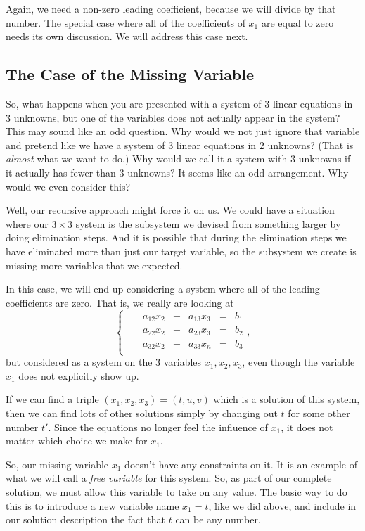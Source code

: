 \documentclass[00-livre-main.tex]{subfiles}
\begin{document}
Again, we need a non-zero leading coefficient, because we will divide by that number.
The special case where all of the coefficients of $x_1$ are equal to zero needs its own discussion. We will address this case next. 

\subsection*{The Case of the Missing Variable}

So, what happens when you are presented with a system of $3$ linear equations in $3$ unknowns, but one of the variables does not actually appear in the system? This may sound like an odd question. Why would we not just ignore that variable and pretend like we have a system of $3$ linear equations in $2$ unknowns? (That is \emph{almost} what we want to do.) Why would we call it a system with $3$ unknowns if it actually has fewer than $3$ unknowns? It seems like an odd arrangement. Why would we even consider this?

Well, our recursive approach might force it on us. We could have a situation where our $3\times 3$ system is the subsystem we devised from something larger by doing elimination steps. And it is possible that during the elimination steps we have eliminated more than just our target variable, so the subsystem we create is missing more variables that we expected.

In this case, we will end up considering a system where all of the leading coefficients are zero. That is, we really are looking at
\[
\left\{\begin{array}{rrrrrrrrr}
 &  & a_{12} x_2 & + & a_{13}x_3 & = & b_1 \\
 &  & a_{22} x_2 & + & a_{23}x_3 & = & b_2 \\
 &  & a_{32} x_2 & + & a_{33}x_n & = & b_3 \\
\end{array}\right. ,
\]
but considered as a system on the $3$ variables $x_1, x_2, x_3$, even though the variable $x_1$ does not explicitly show up. 

If we can find a triple $(x_1,x_2,x_3) = (t,u,v)$ which is a solution of this system, then we can find lots of other solutions simply by changing out $t$ for some other number $t'$. Since the equations no longer feel the influence of $x_1$, it does not matter which choice we make for $x_1$. 

So, our missing variable $x_1$ doesn't have any constraints on it. It is an example of what we will call a \emph{free variable} for this system. So, as part of our complete solution, we must allow this variable to take on any value. The basic way to do this is to introduce a new variable name $x_1=t$, like we did above, and include in our solution description the fact that $t$ can be any number.
\end{document}
